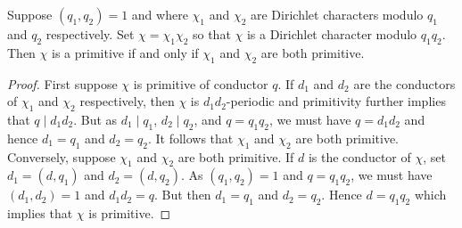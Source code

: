     \begin{proposition}\label{prop:primitive_characters_multiplicative_relatively_prime}
      Suppose $(q_{1},q_{2}) = 1$ and where $\chi_{1}$ and $\chi_{2}$ are Dirichlet characters modulo $q_{1}$ and $q_{2}$ respectively. Set $\chi = \chi_{1}\chi_{2}$ so that $\chi$ is a Dirichlet character modulo $q_{1}q_{2}$. Then $\chi$ is a primitive if and only if $\chi_{1}$ and $\chi_{2}$ are both primitive.
    \end{proposition}
    \begin{proof}
      First suppose $\chi$ is primitive of conductor $q$. If $d_{1}$ and $d_{2}$ are the conductors of $\chi_{1}$ and $\chi_{2}$ respectively, then $\chi$ is $d_{1}d_{2}$-periodic and primitivity further implies that $q \mid d_{1}d_{2}$. But as $d_{1} \mid q_{1}$, $d_{2} \mid q_{2}$, and $q = q_{1}q_{2}$, we must have $q = d_{1}d_{2}$ and hence $d_{1} = q_{1}$ and $d_{2} = q_{2}$. It follows that $\chi_{1}$ and $\chi_{2}$ are both primitive. Conversely, suppose $\chi_{1}$ and $\chi_{2}$ are both primitive. If $d$ is the conductor of $\chi$, set $d_{1} = (d,q_{1})$ and $d_{2} = (d,q_{2})$. As $(q_{1},q_{2}) = 1$ and $q = q_{1}q_{2}$, we must have $(d_{1},d_{2}) = 1$ and $d_{1}d_{2} = q$. But then $d_{1} = q_{1}$ and $d_{2} = q_{2}$. Hence $d = q_{1}q_{2}$ which implies that $\chi$ is primitive.
    \end{proof}
    
